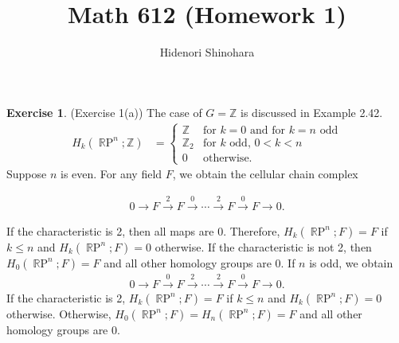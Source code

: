 \documentclass[12pt, psamsfonts]{amsart}
\theoremstyle{definition}
\newtheorem*{exer}{Exercise}
\theoremstyle{remark}
\DeclareMathOperator{\RP}{\mathbb{R}P}
\numberwithin{equation}{section}
\begin{document}
\title{Math 612 (Homework 1)}
\author{Hidenori Shinohara}
\maketitle

\begin{exer}{(Exercise 1(a))}
  The case of $G = \mathbb{Z}$ is discussed in Example 2.42.
  \begin{align*}
    H_k(\RP^n; \mathbb{Z}) &= \begin{cases}
      \mathbb{Z} & \text{for $k = 0$ and for $k = n$ odd} \\
      \mathbb{Z}_2 & \text{for $k$ odd, $0 < k < n$} \\
      0 & \text{otherwise}.
    \end{cases}
  \end{align*}
  Suppose $n$ is even.
  For any field $F$, we obtain the cellular chain complex

  \begin{align*}
    0 \rightarrow F \xrightarrow{2} F \xrightarrow{0} \cdots \xrightarrow{2} F \xrightarrow{0} F \rightarrow 0.
  \end{align*}

  If the characteristic is 2, then all maps are 0.
  Therefore, $H_k(\RP^n; F) = F$ if $k \leq n$ and $H_k(\RP^n; F) = 0$ otherwise.
  If the characteristic is not 2, then $H_0(\RP^n; F) = F$ and all other homology groups are 0.
  If $n$ is odd, we obtain
  \begin{align*}
    0 \rightarrow F \xrightarrow{0} F \xrightarrow{2} \cdots \xrightarrow{2} F \xrightarrow{0} F \rightarrow 0.
  \end{align*}
  If the characteristic is 2, $H_k(\RP^n; F) = F$ if $k \leq n$ and $H_k(\RP^n; F) = 0$ otherwise.
 Otherwise, $H_0(\RP^n; F) = H_n(\RP^n; F) = F$ and all other homology groups are 0.
\end{exer}
\end{document}
